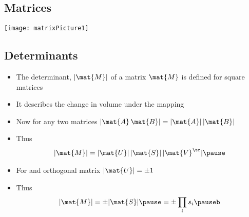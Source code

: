 
\begin{slide}
\section[-2]{Matrices}

\pb \pause
\begin{center}
  \texttt{[image: matrixPicture1]}
\end{center}
\end{slide}




\begin{slide}
\section[-2]{Determinants}

\begin{PauseHighLight}
  \begin{itemize}
  \item The determinant, $|\mat{M}|$ of a matrix $\mat{M}$ is defined
    for square matrices\pause
  \item It describes the change in volume under the mapping\pause
  \item Now for any two matrices $|\mat{A}\,\mat{B}| =
    |\mat{A}|\,|\mat{B}|$\pause
  \item Thus
    \begin{align*}
      |\mat{M}| = |\mat{U}| \, |\mat{S}| \, |\mat{V}^\tr|\pause
    \end{align*}
  \item For and orthogonal matrix $|\mat{U}| = \pm 1$\pause
  \item Thus
    \begin{align*}
      |\mat{M}| = \pm |\mat{S}|\pause = \pm \prod_i s_i\pauseb
    \end{align*}
  \end{itemize}
\end{PauseHighLight}

\end{slide}



